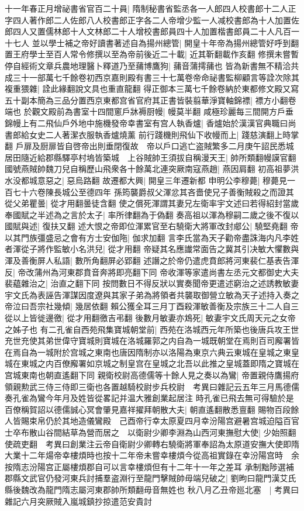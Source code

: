 十一年春正月增祕書省官百二十員|{
	隋制秘書省監丞各一人郎四人校書郎十二人正字四人著作郎二人佐郎八人校書郎正字各二人帝增少監一人减校書郎為十人加置佐郎四人又置儒林郎十人文林郎二十人增校書郎員四十人加置楷書郎員二十人凡百一十七人}
並以學士補之帝好讀書著述自為揚州總管|{
	開皇十年帝為揚州總管好呼到翻}
置王府學士至百人常令修撰以至為帝前後近二十載|{
	近其靳翻載作亥翻}
修撰未嘗暫停自經術文章兵農地理醫卜釋道乃至蒱博鷹狗|{
	蒱音蒲摴蒱也}
皆為新書無不精洽共成三十一部萬七千餘卷初西京嘉則殿有書三十七萬卷帝命祕書監柳顧言等詮次除其複重猥雜|{
	詮此緣翻說文具也重直龍翻}
得正御本三萬七千餘卷納於東都修文殿又寫五十副本簡為三品分置西京東都宫省官府其正書皆裝翦華淨寶軸錦褾|{
	褾方小翻卷端也}
於觀文殿前為書室十四間窻戶牀褥厨幔|{
	幔莫半翻}
咸極珍麗每三間開方戶垂錦幔上有二飛仙戶外地中施機發帝幸書室有宫人執香爐|{
	香爐始於漢漢官典職曰尚書郎給女史二人著潔衣服執香爐燒薰}
前行踐機則飛仙下收幔而上|{
	踐慈演翻上時掌翻}
戶扉及厨扉皆自啓帝出則垂閉復故　帝以戶口逃亡盗賊繁多二月庚午詔民悉城居田隨近給郡縣驛亭村塢皆築城　上谷賊帥王須拔自稱漫天王|{
	帥所類翻幔謨官翻}
國號燕賊帥魏刀兒自稱歷山飛衆各十餘萬北連突厥南寇燕趙|{
	燕因肩翻}
初高祖夢洪水没都城意惡之|{
	惡烏路翻}
故遷都大興|{
	開皇三年遷新都}
申明公李穆薨|{
	穆薨見一百七十六卷陳長城公至德四年}
孫筠襲爵叔父渾忿其吝嗇使兄子善衡賊殺之而證其從父弟瞿曇|{
	從才用翻曇徒含翻}
使之償死渾謂其妻兄左衛率宇文述曰若得紹封當歲奉國賦之半述為之言於太子|{
	率所律翻為于偽翻}
奏高祖以渾為穆嗣二歲之後不復以國賦與述|{
	復扶又翻}
述大恨之帝即位渾累官至右驍衛大將軍改封郕公|{
	驍堅堯翻}
帝以其門族彊盛忌之會有方士安伽陁|{
	伽求加翻}
言李氏當為天子勸帝盡誅海内凡李姓者渾從子將作監敏小名洪兒|{
	從才用翻}
帝疑其名應䜟常面告之冀其引决敏大懼數與渾及善衡屏人私語|{
	數所角翻屏必郢翻}
述譖之於帝仍遣虎賁郎將河東裴仁基表告渾反|{
	帝改蒲州為河東郡賁音奔將即亮翻下同}
帝收渾等家遣尚書左丞元文都御史大夫裴藴雜治之|{
	治直之翻下同}
按問數日不得反狀以實奏聞帝更遣述窮治之述誘教敏妻宇文氏為表誣告渾謀因度遼與其家子弟為將領者共襲取御營立敏為天子述持入奏之帝泣曰吾宗社幾傾|{
	幾居依翻}
賴公獲全耳三月丁酉殺渾敏善衡及宗族三十二人自三從以上皆徙邊徼|{
	從才用翻徼吉弔翻}
後數月敏妻亦鴆死|{
	敏妻宇文氏周天元之女帝之姊子也}
有二孔雀自西苑飛集寶城朝堂前|{
	西苑在洛城西元年所築也後唐兵攻王世充世充使其弟世偉守寶城則寶城在洛城羅郭之内自為一城既朝堂在焉則百司廨署皆在焉自為一城附於宫城之東南也唐因隋制亦以洛陽為東京六典云東城在皇城之東皇城在東城之内百僚廨署如京城之制皇宫在皇城之北吾以此推之皇城蓋即隋之寶城在宫城東南也朝直遙翻下同}
親衛校尉高德儒等十餘人見之奏以為鸞|{
	帝置親侍鷹揚府領親勲武三侍三侍即三衛也各置越騎校尉步兵校尉　考異曰雜記云五年三月馬德儒奏孔雀為鸞今年月及姓皆從畧記并温大雅創業起居注}
時孔雀已飛去無可得驗於是百僚稱賀詔以德儒誠心冥會肇見嘉祥擢拜朝散大夫|{
	朝直遙翻散悉亶翻}
賜物百段餘人皆賜束帛仍於其地造儀鸞殿　己酉帝行幸太原夏四月幸汾陽宫避暑宫城迫隘百官士卒布散山谷間結草為營而居之　以衛尉少卿李淵為山西河東撫慰大使|{
	少始照翻使疏吏翻　考異曰創業注云帝自衛尉少卿轉右驍衛將軍奉詔為太原道安撫大使即隋大業十二年煬帝幸樓煩時也按十二年帝未嘗幸樓煩今從高祖實錄在幸汾陽宫時　余按隋志汾陽宫正屬樓煩郡自可以言幸樓煩但有十二年十一年之差耳}
承制黜陟選補郡縣文武官仍發河東兵討捕羣盗淵行至龍門擊賊帥毋端兒破之|{
	劉昫曰龍門漢艾氏縣後魏改為龍門隋志屬河東郡帥所類翻毋音無姓也}
秋八月乙丑帝廵北塞　|{
	考異曰雜記六月突厥賊入嵐城鎮抄掠遣范安貴討}



